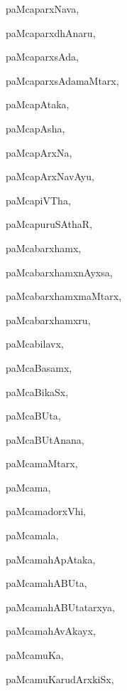 \begin{multicols}{3}
{\noindent
{paMcaparxNava}, \pageref{paMcaparxNava}

\noindent
{paMcaparxdhAnaru}, \pageref{paMcaparxdhAnaru}

\noindent
{paMcaparxsAda}, \pageref{paMcaparxsAda}

\noindent
{paMcaparxsAdamaMtarx}, \pageref{paMcaparxsAdamaMtarx}

\noindent
{paMcapAtaka}, \pageref{paMcapAtaka}

\noindent
{paMcapAsha}, \pageref{paMcapAsha}

\noindent
{paMcapArxNa}, \pageref{paMcapArxNa}

\noindent
{paMcapArxNavAyu}, \pageref{paMcapArxNavAyu}

\noindent
{paMcapiVTha}, \pageref{paMcapiVTha}

\noindent
{paMcapuruSAthaR}, \pageref{paMcapuruSAthaR}

\noindent
{paMcabarxhamx}, \pageref{paMcabarxhamx}

\noindent
{paMcabarxhamxnAyxsa}, \pageref{paMcabarxhamxnAyxsa}

\noindent
{paMcabarxhamxmaMtarx}, \pageref{paMcabarxhamxmaMtarx}

\noindent
{paMcabarxhamxru}, \pageref{paMcabarxhamxru}

\noindent
{paMcabilavx}, \pageref{paMcabilavx}

\noindent
{paMcaBasamx}, \pageref{paMcaBasamx}

\noindent
{paMcaBikaSx}, \pageref{paMcaBikaSx}

\noindent
{paMcaBUta}, \pageref{paMcaBUta2}

\noindent
{paMcaBUtAnana}, \pageref{paMcaBUtAnana}

\noindent
{paMcamaMtarx}, \pageref{paMcamaMtarx}

\noindent
{paMcama}, \pageref{paMcama}

\noindent
{paMcamadorxVhi}, \pageref{paMcamadorxVhi}

\noindent
{paMcamala}, \pageref{paMcamala}

\noindent
{paMcamahApAtaka}, \pageref{paMcamahApAtaka}

\noindent
{paMcamahABUta}, \pageref{paMcamahABUta}

\noindent
{paMcamahABUtatarxya}, \pageref{paMcamahABUtatarxya}

\noindent
{paMcamahAvAkayx}, \pageref{paMcamahAvAkayx}

\noindent
{paMcamuKa}, \pageref{paMcamuKa}

\noindent
{paMcamuKarudArxkiSx}, \pageref{paMcamuKarudArxkiSx}

}
\end{multicols}
